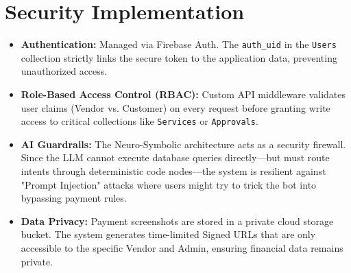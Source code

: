 \documentclass[12pt, a4paper]{article}
\begin{document}
\section{Security Implementation}
\begin{itemize}
    \item \textbf{Authentication:} Managed via Firebase Auth. The \texttt{auth\_uid} in the \texttt{Users} collection strictly links the secure token to the application data, preventing unauthorized access.
    \item \textbf{Role-Based Access Control (RBAC):} Custom API middleware validates user claims (Vendor vs. Customer) on every request before granting write access to critical collections like \texttt{Services} or \texttt{Approvals}.
    \item \textbf{AI Guardrails:} The Neuro-Symbolic architecture acts as a security firewall. Since the LLM cannot execute database queries directly—but must route intents through deterministic code nodes—the system is resilient against "Prompt Injection" attacks where users might try to trick the bot into bypassing payment rules.
    \item \textbf{Data Privacy:} Payment screenshots are stored in a private cloud storage bucket. The system generates time-limited Signed URLs that are only accessible to the specific Vendor and Admin, ensuring financial data remains private.
\end{itemize}
\end{document}
